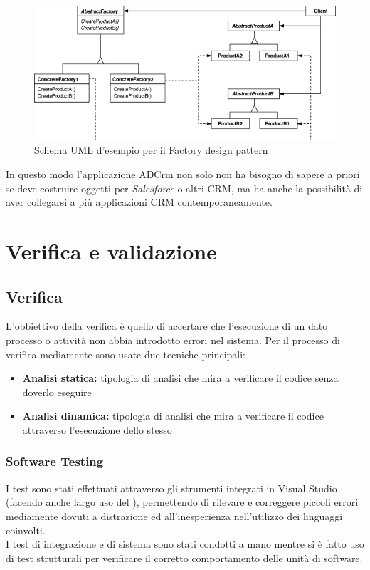 \documentclass[12pt,a4paper,twoside,openany,english]{book}
\begin{document}
\begin{figure}[H]
	\centering
	\includegraphics[width=\linewidth]{images/abstract_factory_structure}
	\caption{Schema UML d'esempio per il Factory design pattern}
	\label{fig:abstractfactorystructure}
\end{figure}

In questo modo l'applicazione ADCrm non solo non ha bisogno di sapere a priori se deve costruire oggetti per \textit{Salesforce} o altri \gls{CRM}, ma ha anche la possibilità di aver collegarsi a più applicazioni \gls{CRM} contemporaneamente.





\chapter{Verifica e validazione}\label{verifica_validazione}
\section{Verifica}
L'obbiettivo della verifica è quello di accertare che l'esecuzione di un dato processo o attività non abbia introdotto errori nel sistema.
Per il processo di verifica mediamente sono usate due tecniche principali:
\begin{itemize}
	\item \textbf{Analisi statica:} tipologia di analisi che mira a verificare il codice senza doverlo eseguire
	\item \textbf{Analisi dinamica:} tipologia di analisi che mira a verificare il codice attraverso l'esecuzione dello stesso
\end{itemize}

\subsection{Software Testing}
I test sono stati effettuati attraverso gli strumenti integrati in Visual Studio (facendo anche largo uso del \textit{}), permettendo di rilevare e correggere piccoli errori mediamente dovuti a distrazione ed all'inesperienza nell'utilizzo dei linguaggi coinvolti.\\
I test di integrazione e di sistema sono stati condotti a mano mentre si è fatto uso di test strutturali per verificare il corretto comportamento delle unità di software.
\end{document}
